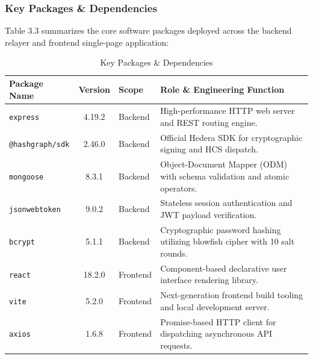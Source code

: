 \documentclass[12pt, a4paper]{article}
\begin{document}
\subsubsection{Key Packages \& Dependencies}
Table 3.3 summarizes the core software packages deployed across the backend relayer and frontend single-page application:

\begin{table}[H]
    \centering
    \caption{Key Packages \& Dependencies}
    \label{tab:packages}
    \begin{tabularx}{\textwidth}{@{}l c l X@{}}
        \toprule
        \textbf{Package Name} & \textbf{Version} & \textbf{Scope} & \textbf{Role \& Engineering Function} \\
        \midrule
        \texttt{express} & 4.19.2 & Backend & High-performance HTTP web server and REST routing engine. \\
        \texttt{@hashgraph/sdk} & 2.46.0 & Backend & Official Hedera SDK for cryptographic signing and HCS dispatch. \\
        \texttt{mongoose} & 8.3.1 & Backend & Object-Document Mapper (ODM) with schema validation and atomic operators. \\
        \texttt{jsonwebtoken} & 9.0.2 & Backend & Stateless session authentication and JWT payload verification. \\
        \texttt{bcrypt} & 5.1.1 & Backend & Cryptographic password hashing utilizing blowfish cipher with 10 salt rounds. \\
        \texttt{react} & 18.2.0 & Frontend & Component-based declarative user interface rendering library. \\
        \texttt{vite} & 5.2.0 & Frontend & Next-generation frontend build tooling and local development server. \\
        \texttt{axios} & 1.6.8 & Frontend & Promise-based HTTP client for dispatching asynchronous API requests. \\
        \bottomrule
    \end{tabularx}
\end{table}
\end{document}
